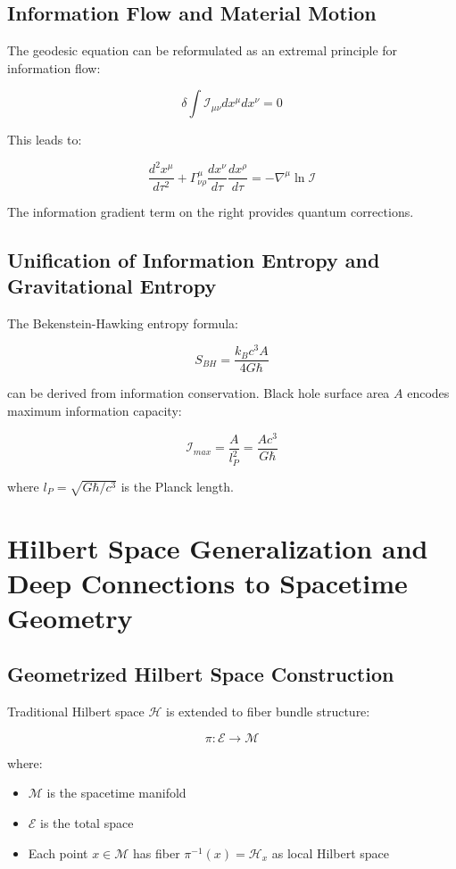 \documentclass[12pt,a4paper]{article}
\begin{document}
\subsection{Information Flow and Material Motion}

The geodesic equation can be reformulated as an extremal principle for information flow:

$$\delta \int \mathcal{I}_{\mu\nu} dx^\mu dx^\nu = 0$$

This leads to:

$$\frac{d^2 x^\mu}{d\tau^2} + \Gamma^\mu_{\nu\rho} \frac{dx^\nu}{d\tau} \frac{dx^\rho}{d\tau} = -\nabla^\mu \ln \mathcal{I}$$

The information gradient term on the right provides quantum corrections.

\subsection{Unification of Information Entropy and Gravitational Entropy}

The Bekenstein-Hawking entropy formula:

$$S_{BH} = \frac{k_B c^3 A}{4G\hbar}$$

can be derived from information conservation. Black hole surface area $A$ encodes maximum information capacity:

$$\mathcal{I}_{max} = \frac{A}{l_P^2} = \frac{Ac^3}{G\hbar}$$

where $l_P = \sqrt{G\hbar/c^3}$ is the Planck length.

\section{Hilbert Space Generalization and Deep Connections to Spacetime Geometry}

\subsection{Geometrized Hilbert Space Construction}

Traditional Hilbert space $\mathcal{H}$ is extended to fiber bundle structure:

$$\pi: \mathcal{E} \rightarrow \mathcal{M}$$

where:
\begin{itemize}
\item $\mathcal{M}$ is the spacetime manifold
\item $\mathcal{E}$ is the total space
\item Each point $x \in \mathcal{M}$ has fiber $\pi^{-1}(x) = \mathcal{H}_x$ as local Hilbert space
\end{itemize}
\end{document}
